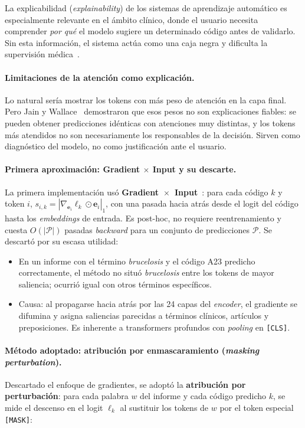 La explicabilidad (\emph{explainability}) de los sistemas de aprendizaje automático es especialmente relevante en el ámbito clínico, donde el usuario necesita comprender \emph{por qué} el modelo sugiere un determinado código antes de validarlo. Sin esta información, el sistema actúa como una caja negra y dificulta la supervisión médica~\cite{Arrieta20}.

\paragraph{Limitaciones de la atención como explicación.}
Lo natural sería mostrar los tokens con más peso de atención en la capa final. Pero Jain y Wallace~\cite{Jain19} demostraron que esos pesos no son explicaciones fiables: se pueden obtener predicciones idénticas con atenciones muy distintas, y los tokens más atendidos no son necesariamente los responsables de la decisión. Sirven como diagnóstico del modelo, no como justificación ante el usuario.

\paragraph{Primera aproximación: Gradient $\times$ Input y su descarte.}
La primera implementación usó \textbf{Gradient~$\times$~Input}~\cite{Simonyan14}: para cada código $k$ y token $i$, $s_{i,k} = |\nabla_{\mathbf{e}_i}\ell_k \odot \mathbf{e}_i|_1$, con una pasada hacia atrás desde el logit del código hasta los \emph{embeddings} de entrada. Es post-hoc, no requiere reentrenamiento y cuesta $O(|\mathcal{P}|)$ pasadas \emph{backward} para un conjunto de predicciones $\mathcal{P}$. Se descartó por su escasa utilidad:

\begin{itemize}
 \item En un informe con el término \emph{brucelosis} y el código A23 predicho correctamente, el método no situó \emph{brucelosis} entre los tokens de mayor saliencia; ocurrió igual con otros términos específicos.
 \item Causa: al propagarse hacia atrás por las 24 capas del \emph{encoder}, el gradiente se difumina y asigna saliencias parecidas a términos clínicos, artículos y preposiciones. Es inherente a transformers profundos con \emph{pooling} en \texttt{[CLS]}.
\end{itemize}

\paragraph{Método adoptado: atribución por enmascaramiento (\emph{masking perturbation}).}
Descartado el enfoque de gradientes, se adoptó la \textbf{atribución por perturbación}: para cada palabra $w$ del informe y cada código predicho $k$, se mide el descenso en el logit $\ell_k$ al sustituir los tokens de $w$ por el token especial \texttt{[MASK]}:

